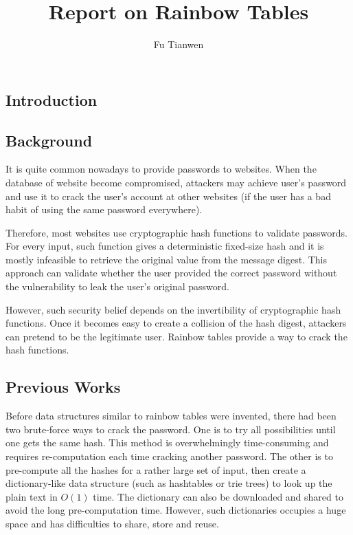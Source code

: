 \documentclass{article}
\title{Report on Rainbow Tables}
\author{Fu Tianwen}
\begin{document}
\maketitle
\begin{multicols}{2}
\section{Introduction}
\subsection{Background}
It is quite common nowadays to provide passwords to websites. When the database of website become compromised, attackers may achieve user's password and use it to crack the user's account at other websites (if the user has a bad habit of using the same password everywhere).

Therefore, most websites use cryptographic hash functions to validate passwords. For every input, such function gives a deterministic fixed-size hash and it is mostly infeasible to retrieve the original value from the message digest\cite{wiki:cryptoHash}. This approach can validate whether the user provided the correct password without the vulnerability to leak the user's original password.

However, such security belief depends on the invertibility of cryptographic hash functions. Once it becomes easy to create a collision of the hash digest, attackers can pretend to be the legitimate user. Rainbow tables provide a way to crack the hash functions.

\subsection{Previous Works}
Before data structures similar to rainbow tables were invented, there had been two brute-force ways to crack the password. One is to try all possibilities until one gets the same hash. This method is overwhelmingly time-consuming and requires re-computation each time cracking another password. The other is to pre-compute all the hashes for a rather large set of input, then create a dictionary-like data structure (such as hashtables or trie trees) to look up the plain text in $O(1)$ time. The dictionary can also be downloaded and shared to avoid the long pre-computation time. However, such dictionaries occupies a huge space and has difficulties to share, store and reuse.


\end{multicols}
\end{document}
